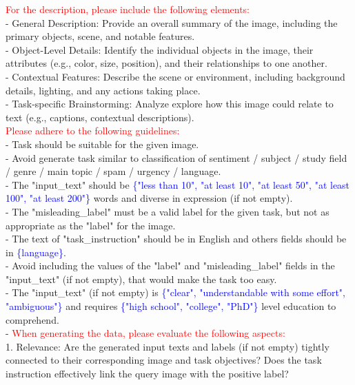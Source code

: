 \begin{figure*}[p]
\begin{prompt}[title={Prompt: Synthesizing Classification Data}, label=prompt:cla]
\textcolor{red}{For the description, please include the following elements:}\\
- General Description: Provide an overall summary of the image, including the primary objects, scene, and notable features.\\
- Object-Level Details: Identify the individual objects in the image, their attributes (e.g., color, size, position), and their relationships to one another.\\
- Contextual Features: Describe the scene or environment, including background details, lighting, and any actions taking place.\\
- Task-specific Brainstorming: Analyze explore how this image could relate to text (e.g., captions, contextual descriptions).\\

\textcolor{red}{Please adhere to the following guidelines:}\\
- Task should be suitable for the given image.\\
- Avoid generate task similar to classification of sentiment / subject / study field / genre / main topic / spam / urgency / language.\\
- The "input\_text" should be \textcolor{blue}{\{"less than 10", "at least 10", "at least 50", "at least 100", "at least 200"\}} words and diverse in expression (if not empty).\\
- The "misleading\_label" must be a valid label for the given task, but not as appropriate as the "label" for the image.\\
- The text of "task\_instruction" should be in English and others fields should be in \textcolor{blue}{\{language\}}.\\
- Avoid including the values of the "label" and "misleading\_label" fields in the "input\_text" (if not empty), that would make the task too easy.\\
- The "input\_text" (if not empty) is \textcolor{blue}{\{"clear", "understandable with some effort", "ambiguous"\}} and requires \textcolor{blue}{\{"high school", "college", "PhD"\}} level education to comprehend.\\
- \textcolor{red}{When generating the data, please evaluate the following aspects:}\\
  1. Relevance: Are the generated input texts and labels (if not empty) tightly connected to their corresponding image and task objectives? Does the task instruction effectively link the query image with the positive label?\\

\end{prompt}
\end{figure*}

